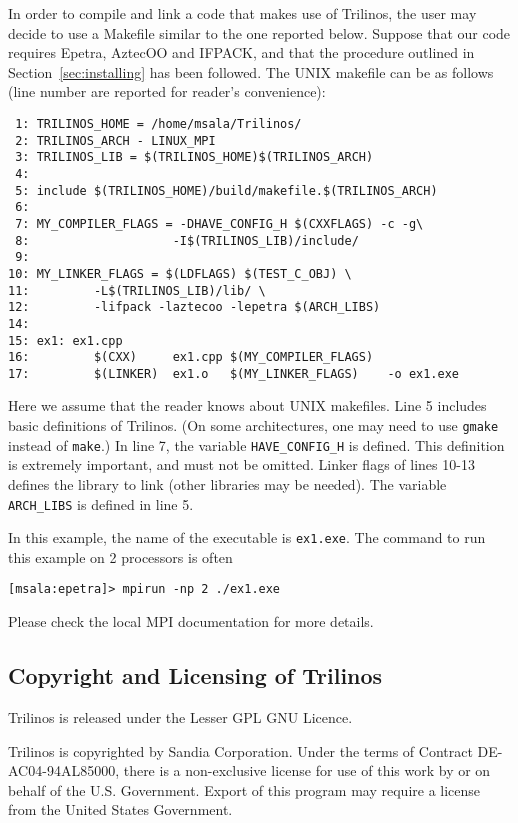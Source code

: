 In order to compile and link a code that makes use of Trilinos, the user
may decide to use a Makefile similar to the one reported below.  Suppose
that our code requires Epetra, AztecOO and IFPACK, and that the
procedure outlined in Section~\ref{sec:installing} has been followed.
The UNIX makefile can be as follows (line number are reported for
reader's convenience):
\begin{verbatim}
 1: TRILINOS_HOME = /home/msala/Trilinos/
 2: TRILINOS_ARCH - LINUX_MPI
 3: TRILINOS_LIB = $(TRILINOS_HOME)$(TRILINOS_ARCH)
 4: 
 5: include $(TRILINOS_HOME)/build/makefile.$(TRILINOS_ARCH)
 6: 
 7: MY_COMPILER_FLAGS = -DHAVE_CONFIG_H $(CXXFLAGS) -c -g\
 8:                    -I$(TRILINOS_LIB)/include/
 9:
10: MY_LINKER_FLAGS = $(LDFLAGS) $(TEST_C_OBJ) \
11:         -L$(TRILINOS_LIB)/lib/ \
12:         -lifpack -laztecoo -lepetra $(ARCH_LIBS)
14:
15: ex1: ex1.cpp
16:         $(CXX)     ex1.cpp $(MY_COMPILER_FLAGS)
17:         $(LINKER)  ex1.o   $(MY_LINKER_FLAGS)    -o ex1.exe
\end{verbatim}
Here we assume that the reader knows about UNIX makefiles.  Line 5
includes basic definitions of Trilinos. (On some architectures, one may
need to use \verb!gmake! instead of \verb!make!.)  In line 7, the
variable \verb!HAVE_CONFIG_H! is defined.  This definition is extremely
important, and must not be omitted.  Linker flags of lines 10-13 defines
the library to link (other libraries may be needed).  The variable
\verb!ARCH_LIBS! is defined in line 5.

In this example, the name of the executable is \verb!ex1.exe!.  The
command to run this example on 2 processors is often
\begin{verbatim}
[msala:epetra]> mpirun -np 2 ./ex1.exe
\end{verbatim}
Please check the local MPI documentation for more details. 


\subsection{Copyright and Licensing of Trilinos}
\label{sec:copyright}

Trilinos is released under the Lesser GPL GNU Licence.

Trilinos is copyrighted by Sandia Corporation. Under the terms of
Contract DE-AC04-94AL85000, there is a non-exclusive license for use of
this work by or on behalf of the U.S. Government.  Export of this
program may require a license from the United States Government.

